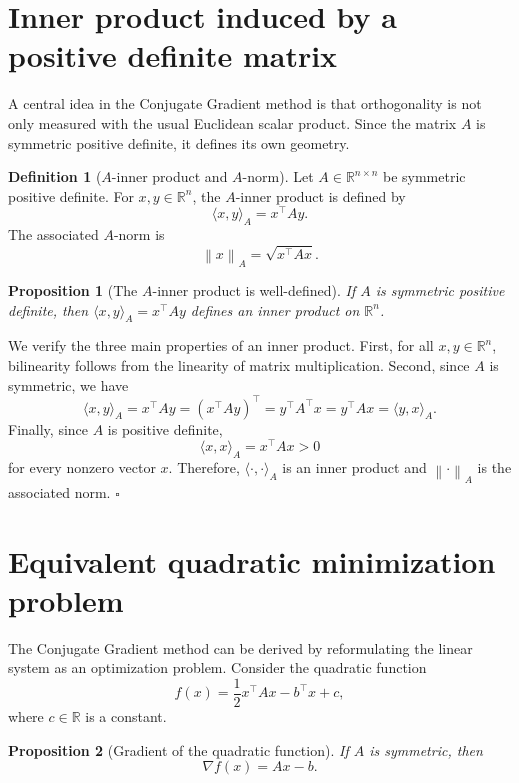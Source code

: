 \documentclass[11pt,a4paper]{report}
\theoremstyle{definition}
\newtheorem{definition}{Definition}[chapter]
\theoremstyle{plain}
\newtheorem{proposition}{Proposition}[chapter]
\theoremstyle{remark}
\renewenvironment{proof}[1][Proof]{%
  \begin{tcolorbox}[enhanced, breakable, colback=white, colframe=black!25, boxrule=0.5pt, arc=1.5mm, borderline west={2pt}{0pt}{black!45}, title=\textbf{#1}, coltitle=bleufonce, fonttitle=\bfseries]
}{%
  \hfill$\square$\end{tcolorbox}
}
\newcommand{\norm}[1]{\left\lVert #1 \right\rVert}
\begin{document}
\section{Inner product induced by a positive definite matrix}

A central idea in the Conjugate Gradient method is that orthogonality is not only measured with the usual Euclidean scalar product. Since the matrix $A$ is symmetric positive definite, it defines its own geometry.

\begin{definition}[$A$-inner product and $A$-norm]
Let $A\in\mathbb{R}^{n\times n}$ be symmetric positive definite. For $x,y\in\mathbb{R}^n$, the $A$-inner product is defined by
\[
\langle x,y\rangle_A=x^\top Ay.
\]
The associated $A$-norm is
\[
\norm{x}_A=\sqrt{x^\top A x}.
\]
\end{definition}

\begin{proposition}[The $A$-inner product is well-defined]
If $A$ is symmetric positive definite, then $\langle x,y\rangle_A=x^\top Ay$ defines an inner product on $\mathbb{R}^n$.
\end{proposition}

\begin{proof}
We verify the three main properties of an inner product. First, for all $x,y\in\mathbb{R}^n$, bilinearity follows from the linearity of matrix multiplication. Second, since $A$ is symmetric, we have
\[
\langle x,y\rangle_A=x^\top Ay=(x^\top Ay)^\top=y^\top A^\top x=y^\top Ax=\langle y,x\rangle_A.
\]
Finally, since $A$ is positive definite,
\[
\langle x,x\rangle_A=x^\top Ax>0
\]
for every nonzero vector $x$. Therefore, $\langle \cdot,\cdot\rangle_A$ is an inner product and $\norm{\cdot}_A$ is the associated norm.
\end{proof}

\section{Equivalent quadratic minimization problem}

The Conjugate Gradient method can be derived by reformulating the linear system as an optimization problem. Consider the quadratic function
\[
f(x)=\frac12 x^\top A x-b^\top x+c,
\]
where $c\in\mathbb{R}$ is a constant.

\begin{proposition}[Gradient of the quadratic function]
If $A$ is symmetric, then
\[
\nabla f(x)=Ax-b.
\]
\end{proposition}
\end{document}
